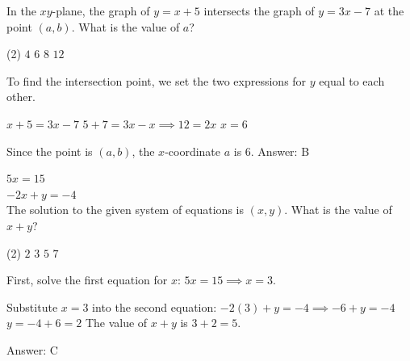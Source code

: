 \documentclass[11pt,paper=a4,answers]{exam}
\begin{document}
\begin{questions}
\vspace{1cm}

\question
In the $xy$-plane, the graph of $y = x + 5$ intersects the graph of $y = 3x - 7$ at the point $(a, b)$. What is the value of $a$?
\begin{tasks}(2)
\task $4$
\task $6$
\task $8$
\task $12$
\end{tasks}

\begin{solution}
To find the intersection point, we set the two expressions for $y$ equal to each other.
\vspace{5pt}
\begin{center}
$x + 5 = 3x - 7$
\vspace{5pt}
$5 + 7 = 3x - x \implies 12 = 2x$
\vspace{5pt}
$x = 6$
\end{center}
\vspace{5pt}
Since the point is $(a, b)$, the $x$-coordinate $a$ is $6$.
\vspace{5pt}
Answer: \colorbox{yellow!100}{B}
\end{solution}

\vspace{1cm}

\question
$5x = 15$ \\
$-2x + y = -4$ \\
The solution to the given system of equations is $(x, y)$. What is the value of $x + y$?
\begin{tasks}(2)
\task $2$
\task $3$
\task $5$
\task $7$
\end{tasks}

\begin{solution}
First, solve the first equation for $x$: $5x = 15 \implies x = 3$.
\vspace{5pt}
\begin{center}
Substitute $x = 3$ into the second equation:
\vspace{5pt}
$-2(3) + y = -4 \implies -6 + y = -4$
\vspace{5pt}
$y = -4 + 6 = 2$
\vspace{5pt}
The value of $x + y$ is $3 + 2 = 5$.
\end{center}
\vspace{5pt}
Answer: \colorbox{yellow!100}{C}
\end{solution}

\vspace{1cm}


\end{questions}
\end{document}
